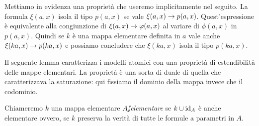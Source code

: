 % 
% 

Mettiamo in evidenza una propriet\`a che useremo implicitamente nel seguito. La formula $\xi(a,x)$ isola il tipo $p(a,x)$ se vale $\xi(a,x)\rightarrow p(a,x)$. Quest'espressione \`e equivalente alla congiunzione di $\xi(a,x)\rightarrow\varphi(a,x)$ al variare di $\phi(a,x)$ in $p(a,x)$. Quindi se $k$ \`e una mappa elementare definita in $a$ vale anche $\xi(ka,x)\rightarrow p(ka,x)$ e possiamo concludere che $\xi(ka,x)$ isola il tipo $p(ka,x)$.

Il seguente lemma caratterizza i modelli atomici con una propriet\`a di estendibilit\`a delle mappe elementari. La propriet\`a \`e una sorta di duale di quella che caratterizzava la saturazione: qui fissiamo il dominio della mappa invece che il codominio.

Chiameremo $k$ una mappa elementare \emph{$A\jj$elementare\/} se $k\cup\textrm{id}_A$ \`e anche elementare ovvero, se $k$ preserva la verit\`a di tutte le formule a parametri in $A$.

